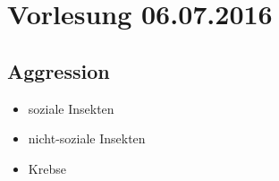 \section{Vorlesung 06.07.2016}

\subsection{Aggression}

\begin{itemize}
	\item soziale Insekten
	\item nicht-soziale Insekten
	\item Krebse
\end{itemize}